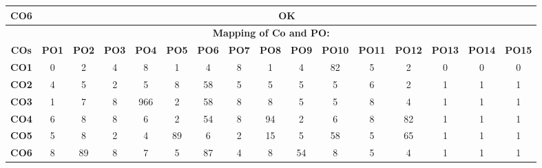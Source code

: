 \documentclass[a4paper]{article}%
\begin{document}
\begin{longtable}{|c|c|c|c|c|c|c|c|c|c|c|c|c|c|c|c|}
\hline%
\textbf{CO6}&\multicolumn{15}{|p{15cm}|}{OK}\\%
\hline%
\multicolumn{16}{|c|}{\textbf{Mapping of Co and PO:}}\\%
\hline%
\textbf{COs}&\textbf{PO1}&\textbf{PO2}&\textbf{PO3}&\textbf{PO4}&\textbf{PO5}&\textbf{PO6}&\textbf{PO7}&\textbf{PO8}&\textbf{PO9}&\textbf{PO10}&\textbf{PO11}&\textbf{PO12}&\textbf{PO13}&\textbf{PO14}&\textbf{PO15}\\%
\hline%
\textbf{CO1}&0&2&4&8&1&4&8&1&4&82&5&2&0&0&0\\%
\hline%
\textbf{CO2}&4&5&2&5&8&58&5&5&5&5&6&2&1&1&1\\%
\hline%
\textbf{CO3}&1&7&8&966&2&58&8&8&5&5&8&4&1&1&1\\%
\hline%
\textbf{CO4}&6&8&8&6&2&54&8&94&2&6&8&82&1&1&1\\%
\hline%
\textbf{CO5}&5&8&2&4&89&6&2&15&5&58&5&65&1&1&1\\%
\hline%
\textbf{CO6}&8&89&8&7&5&87&4&8&54&8&5&4&1&1&1\\%
\hline%
\end{longtable}%
\end{document}
